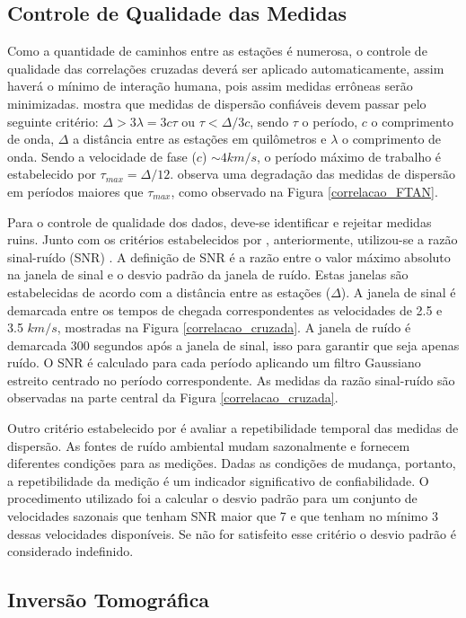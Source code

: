 \subsection{Controle de Qualidade das Medidas}

Como a quantidade de caminhos entre as estações é numerosa, o controle de qualidade das correlações cruzadas deverá ser aplicado automaticamente, assim haverá o mínimo de interação humana, pois assim medidas errôneas serão minimizadas. \cite{bensen_processing_2007} mostra que medidas de dispersão confiáveis devem passar pelo seguinte critério: $\Delta > 3\lambda = 3c\tau$ ou $\tau < \Delta/3c$, sendo $\tau$ o período, $c$ o comprimento de onda, $\Delta$ a distância entre as estações em quilômetros e $\lambda$ o comprimento de onda. Sendo a velocidade de fase ($c$) $\sim 4 km/s$, o período máximo de trabalho é estabelecido por $\tau_{max} = \Delta/12$. \cite{bensen_processing_2007} observa uma degradação das medidas de dispersão em períodos maiores que $\tau_{max}$, como observado na Figura \ref{correlacao_FTAN}. 

Para o controle de qualidade dos dados, deve-se identificar e rejeitar medidas ruins. Junto com os critérios estabelecidos por \cite{bensen_processing_2007}, anteriormente, utilizou-se a razão sinal-ruído (SNR) . A definição de SNR é a razão entre o valor máximo absoluto na janela de sinal e o desvio padrão da janela de ruído. Estas janelas são estabelecidas de acordo com a distância entre as estações ($\Delta$). A janela de sinal é demarcada entre os tempos de chegada correspondentes as velocidades de 2.5 e 3.5 $km/s$, mostradas na Figura \ref{correlacao_cruzada}. A janela de ruído é demarcada 300 segundos após a janela de sinal, isso para garantir que seja apenas ruído. O SNR é calculado para cada período aplicando um filtro Gaussiano estreito centrado no período correspondente. As medidas da razão sinal-ruído são observadas na parte central da Figura \ref{correlacao_cruzada}. 

Outro critério estabelecido por \cite{bensen_processing_2007} é avaliar a repetibilidade temporal das medidas de dispersão. As fontes de ruído ambiental mudam sazonalmente e fornecem diferentes condições
para as medições. Dadas as condições de mudança, portanto, a repetibilidade da medição é um indicador significativo de confiabilidade. O procedimento utilizado foi a calcular o desvio padrão para um conjunto de velocidades sazonais que tenham SNR maior que 7 e que tenham no mínimo 3 dessas velocidades disponíveis. Se não for satisfeito esse critério o desvio padrão é considerado indefinido.

\subsection{Inversão Tomográfica}




